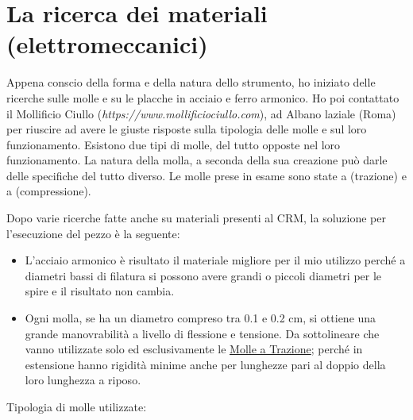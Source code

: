 
\chapter{La ricerca dei materiali (elettromeccanici)}
\label{chp:La ricerca dei materiali (elettromeccanici)}

Appena conscio della forma e della natura dello strumento, ho iniziato delle ricerche sulle molle e su le placche in acciaio e ferro armonico. Ho poi contattato il Mollificio Ciullo (\textit{https://www.mollificiociullo.com}), ad Albano laziale (Roma) per riuscire ad avere le giuste risposte sulla tipologia delle molle e sul loro funzionamento. Esistono due tipi di molle, del tutto opposte nel loro funzionamento. La natura della molla, a seconda della sua creazione può darle delle specifiche del tutto diverso. Le molle prese in esame sono state a (trazione) e a (compressione).

Dopo varie ricerche fatte anche su materiali presenti al CRM, la soluzione per l'esecuzione del pezzo è la seguente:

\begin{itemize}
\item{L'acciaio armonico è risultato il materiale migliore per il mio utilizzo perché a diametri bassi di filatura si possono avere grandi o piccoli diametri per le spire e il risultato non cambia.}
\item{Ogni molla, se ha un diametro compreso tra 0.1 e 0.2 cm, si ottiene una grande manovrabilità a livello di flessione e tensione. Da sottolineare che vanno utilizzate solo ed esclusivamente le \underline {Molle a Trazione}; perché in estensione hanno rigidità minime anche per lunghezze pari al doppio della loro lunghezza a riposo.}
\end{itemize}

Tipologia di molle utilizzate:


